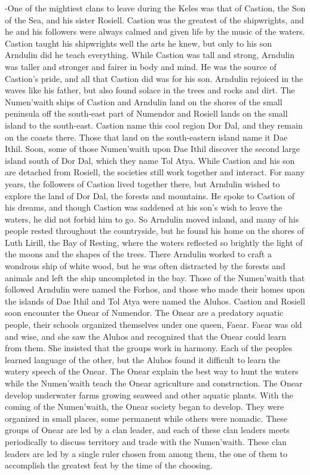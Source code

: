 \documentclass[smalldemyvopaper,11pt,twoside,onecolumn,openright,extrafontsizes]{memoir}
\begin{document}
-One of the mightiest clans to leave during the Keles was that of Castion, the Son of the Sea, and his sister Rosiell. Castion was the greatest of the shipwrights, and he and his followers were always calmed and given life by the music of the waters. Castion taught his shipwrights well the arts he knew, but only to his son Arndulin did he teach everything. While Castion was tall and strong, Arndulin was taller and stronger and fairer in body and mind. He was the source of Castion’s pride, and all that Castion did was for his son. Arndulin rejoiced in the waves like his father, but also found solace in the trees and rocks and dirt. The Numen’waith ships of Castion and Arndulin land on the shores of the small peninsula off the south-east part of Numendor and Rosiell lands on the small island to the south-east. Castion name this cool region Dor Dal, and they remain on the coasts there. Those that land on the south-eastern island name it Dae Ithil. Soon, some of those Numen’waith upon Dae Ithil discover the second large island south of Dor Dal, which they name Tol Atya. While Castion and his son are detached from Rosiell, the societies still work together and interact. For many years, the followers of Castion lived together there, but Arndulin wished to explore the land of Dor Dal, the forests and mountains. He spoke to Castion of his dreams, and though Castion was saddened at his son’s wish to leave the waters, he did not forbid him to go. So Arndulin moved inland, and many of his people rested throughout the countryside, but he found his home on the shores of Luth Lirill, the Bay of Resting, where the waters reflected so brightly the light of the moons and the shapes of the trees. There Arndulin worked to craft a wondrous ship of white wood, but he was often distracted by the forests and animals and left the ship uncompleted in the bay. Those of the Numen’waith that followed Arndulin were named the Forhos, and those who made their homes upon the islands of Dae Ithil and Tol Atya were named the Aluhos. Castion and Rosiell soon encounter the Onear of Numendor. The Onear are a predatory aquatic people, their schools organized themselves under one queen, Faear. Faear was old and wise, and she saw the Aluhos and recognized that the Onear could learn from them. She insisted that the groups work in harmony. Each of the peoples learned language of the other, but the Aluhos found it difficult to learn the watery speech of the Onear. The Onear explain the best way to hunt the waters while the Numen’waith teach the Onear agriculture and construction. The Onear develop underwater farms growing seaweed and other aquatic plants. With the coming of the Numen’waith, the Onear society began to develop. They were organized in small places, some permanent while others were nomadic. These groups of Onear are led by a clan leader, and each of these clan leaders meets periodically to discuss territory and trade with the Numen’waith. These clan leaders are led by a single ruler chosen from among them, the one of them to accomplish the greatest feat by the time of the choosing. 
\end{document}
